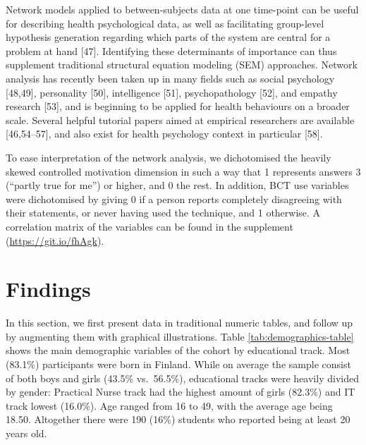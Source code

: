 \documentclass[english,man,floatsintext]{apa6}
\begin{document}
Network models applied to between-subjects data at one time-point can be useful for describing health psychological data, as well as facilitating group-level hypothesis generation regarding which parts of the system are central for a problem at hand {[}47{]}. Identifying these determinants of importance can thus supplement traditional structural equation modeling (SEM) approaches. Network analysis has recently been taken up in many fields such as social psychology {[}48,49{]}, personality {[}50{]}, intelligence {[}51{]}, psychopathology {[}52{]}, and empathy research {[}53{]}, and is beginning to be applied for health behaviours on a broader scale. Several helpful tutorial papers aimed at empirical researchers are available {[}46,54--57{]}, and also exist for health psychology context in particular {[}58{]}.

To ease interpretation of the network analysis, we dichotomised the heavily skewed controlled motivation dimension in such a way that 1 represents answers 3 (\enquote{partly true for me}) or higher, and 0 the rest. In addition, BCT use variables were dichotomised by giving 0 if a person reports completely disagreeing with their statements, or never having used the technique, and 1 otherwise. A correlation matrix of the variables can be found in the supplement (\url{https://git.io/fhAgk}).

\hypertarget{findings}{%
\section{Findings}\label{findings}}

In this section, we first present data in traditional numeric tables, and follow up by augmenting them with graphical illustrations. Table \ref{tab:demographics-table} shows the main demographic variables of the cohort by educational track. Most (83.1\%) participants were born in Finland. While on average the sample consist of both boys and girls (43.5\% vs.~56.5\%), educational tracks were heavily divided by gender: Practical Nurse track had the highest amount of girls (82.3\%) and IT track lowest (16.0\%). Age ranged from 16 to 49, with the average age being 18.50. Altogether there were 190 (16\%) students who reported being at least 20 years old.
\end{document}
